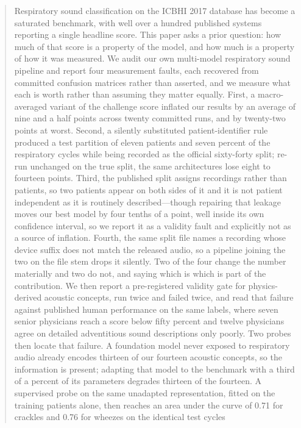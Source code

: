 \documentclass[journal,onecolumn]{IEEEtran}
\begin{document}
\begin{abstract}
Respiratory sound classification on the ICBHI 2017 database has become a saturated
benchmark, with well over a hundred published systems reporting a single headline
score. This paper asks a prior question: how much of that score is a property of the
model, and how much is a property of how it was measured. We audit our own
multi-model respiratory sound pipeline and report four measurement faults, each
recovered from committed confusion matrices rather than asserted, and we measure what
each is worth rather than assuming they matter equally. First, a
macro-averaged variant of the challenge score inflated our results by an average of
nine and a half points across twenty committed runs, and by twenty-two points at worst.
Second, a silently substituted patient-identifier rule produced a test partition of
eleven patients and seven percent of the respiratory cycles while being recorded as
the official sixty-forty split; re-run unchanged on the true split, the same
architectures lose eight to fourteen points. Third, the published split assigns
recordings rather than patients, so two patients appear on both sides of it and it is
not patient independent as it is routinely described---though repairing that leakage
moves our best model by four tenths of a point, well inside its own confidence
interval, so we report it as a validity fault and explicitly not as a source of
inflation. Fourth, the same split file names a recording whose device suffix does not
match the released audio, so a pipeline joining the two on the file stem drops it
silently. Two of the four change the number materially and two do not, and saying which
is which is part of the contribution. We then report a pre-registered
validity gate for physics-derived acoustic concepts, run twice and failed twice, and
read that failure against published human performance on the same labels, where seven
senior physicians reach a score below fifty percent and twelve physicians agree on
detailed adventitious sound descriptions only poorly. Two probes then locate that failure. A foundation model never exposed to
respiratory audio already encodes thirteen of our fourteen acoustic concepts, so the
information is present; adapting that model to the benchmark with a third of a percent
of its parameters degrades thirteen of the fourteen. A supervised probe on the same
unadapted representation, fitted on the training patients alone, then reaches an area
under the curve of 0.71 for crackles and 0.76 for wheezes on the identical test cycles

\end{abstract}
\end{document}
